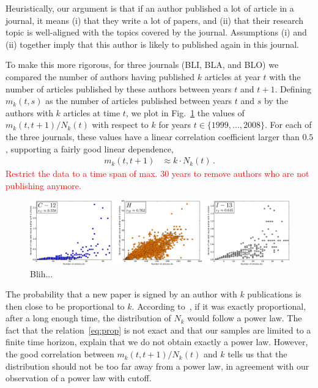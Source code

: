 \documentclass[aps,prl,floatfix,twocolumn]{revtex4-1}
\begin{document}
Heuristically, our argument is that if an author published a lot of article in a journal, it means (i) that they write a lot of papers, 
and (ii) that their research topic is well-aligned with the topics covered by the journal. 
Assumptions (i) and (ii) together imply that this author is likely to published again in this journal. 

To make this more rigorous, for three journals (BLI, BLA, and BLO) we compared the number of authors having published $k$ articles at year $t$ 
with the number of articles published by these authors between years $t$ and $t+1$. 
Defining $m_k(t,s)$ as the number of articles published between years $t$ and $s$ by the authors with $k$ articles at time $t$, we plot in Fig.~\ref{fig:2} the values of $m_k(t,t+1)/N_k(t)$ with respect to $k$ for years $t\in\{1999,...,2008\}$. 
For each of the three journals, these values have a linear correlation coefficient larger than $0.5$, supporting a fairly good linear dependence, 
\begin{align}\label{eq:prop}
 m_k(t,t+1) &\approx k\cdot N_k(t)\, . 
\end{align}
\textcolor{red}{Restrict the data to a time span of max. 30 years to remove authors who are not publishing anymore.}

\begin{figure}
 \centering
 \includegraphics[width=\textwidth]{figures/CHI_correl.pdf}
 \caption{Blih...}
 \label{fig:2}
\end{figure}

The probability that a new paper is signed by an author with $k$ publications is then close to be proportional to $k$. 
According to~\cite{Kra00}, if it was exactly proportional, after a long enough time, the distribution of $N_k$ would follow a power law. 
The fact that the relation~\eqref{eq:prop} is not exact and that our samples are limited to a finite time horizon, explain that we do not obtain exactly a power law. 
However, the good correlation between $m_k(t,t+1)/N_k(t)$ and $k$ tells us that the distribution should not be too far away from a power law, in agreement with our observation of a power law with cutoff.
\end{document}
